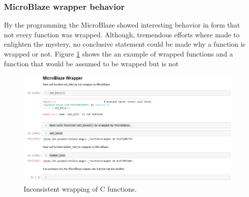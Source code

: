 \subsubsection{MicroBlaze wrapper behavior}
By the programming the MicroBlaze showed interesting behavior in form that not every function was wrapped. Although, tremendous efforts where made to enlighten the mystery, no conclusive statement could be made why a function is wrapped or not. Figure \ref{fig: p3_microblaze_wrapper} shows the an example of wrapped functions and a function that would be assumed to be wrapped but is not
\begin{figure}[H]
	\centering
	\includegraphics[width=1\textwidth]{01_images/p3_microblaze_wrapper}
	\caption{Inconsistent wrapping of C functions.}
	\label{fig: p3_microblaze_wrapper}
\end{figure}
